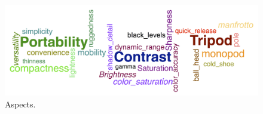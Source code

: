 \documentclass{article} %
\begin{document}

\begin{figure}[ht]
\begin{center}
\includegraphics[width=\columnwidth]{Aspects_long.png}
\end{center}
\caption{Aspects.}
\label{aspectFig}
\end{figure}
\end{document}
